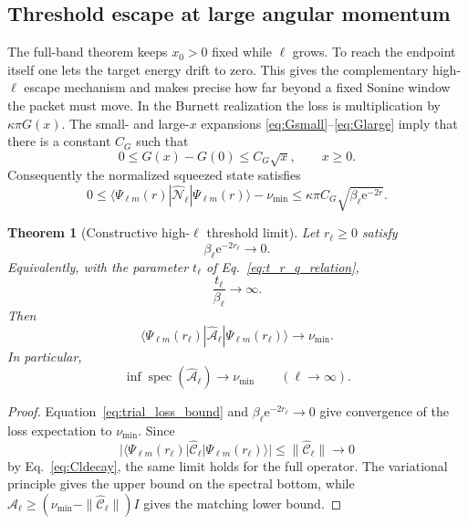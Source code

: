 \documentclass[11pt]{article}
\numberwithin{equation}{section}
\newcommand{\spec}{\operatorname{spec}}
\newcommand{\e}{\mathrm e}
\newtheorem{theorem}{Theorem}[section]
\theoremstyle{definition}
\begin{document}
\subsection{Threshold escape at large angular momentum}

The full-band theorem keeps $x_0>0$ fixed while $\ell$ grows.  To reach the
endpoint itself one lets the target energy drift to zero.  This gives the
complementary high-$\ell$ escape mechanism and makes precise how far beyond a
fixed Sonine window the packet must move.  In the Burnett realization the loss
is multiplication by $\kappa\pi G(x)$.  The small- and
large-$x$ expansions \eqref{eq:Gsmall}--\eqref{eq:Glarge} imply that there is
a constant $C_G$ such that
\begin{equation}
 0\le G(x)-G(0)\le C_G\sqrt{x},
 \qquad x\ge0.
 \label{eq:G_threshold_bound}
\end{equation}
Consequently the normalized squeezed state satisfies
\begin{equation}
 0\le
 \langle\Psi_{\ell m}(r)|\widehat{\mathcal N}_\ell|\Psi_{\ell m}(r)\rangle
 -\nu_{\min}
 \le
 \kappa\pi C_G\sqrt{\beta_\ell\e^{-2r}}.
 \label{eq:trial_loss_bound}
\end{equation}

\begin{theorem}[Constructive high-$\ell$ threshold limit]
Let $r_\ell\ge0$ satisfy
\begin{equation}
 \beta_\ell\e^{-2r_\ell}\longrightarrow0.
 \label{eq:r_escape_condition}
\end{equation}
Equivalently, with the parameter $t_\ell$ of
Eq.~\eqref{eq:t_r_q_relation},
\begin{equation}
 \frac{t_\ell}{\beta_\ell}\longrightarrow\infty.
 \label{eq:t_escape_condition}
\end{equation}
Then
\begin{equation}
 \langle\Psi_{\ell m}(r_\ell)|
 \widehat{\mathcal A}_\ell|\Psi_{\ell m}(r_\ell)\rangle
 \longrightarrow\nu_{\min}.
 \label{eq:trial_full_threshold}
\end{equation}
In particular,
\begin{equation}
 \boxed{
 \inf\spec(\widehat{\mathcal A}_\ell)\longrightarrow\nu_{\min}
 \qquad(\ell\to\infty).
 }
 \label{eq:bottom_limit}
\end{equation}
\end{theorem}

\begin{proof}
Equation~\eqref{eq:trial_loss_bound} and
$\beta_\ell\e^{-2r_\ell}\to0$ give convergence of the loss expectation to
$\nu_{\min}$.  Since
\begin{equation}
 |\langle\Psi_{\ell m}(r_\ell)|\widehat{\mathcal C}_\ell|
 \Psi_{\ell m}(r_\ell)\rangle|
 \le\|\widehat{\mathcal C}_\ell\|
 \longrightarrow0
\end{equation}
by Eq.~\eqref{eq:Cldecay}, the same limit holds for the full operator.  The
variational principle \cite{ReedSimon1980} gives the upper bound on the spectral bottom, while
$\widehat{\mathcal A}_\ell\ge
(\nu_{\min}-\|\widehat{\mathcal C}_\ell\|)I$ gives the matching
lower bound.
\end{proof}
\end{document}
